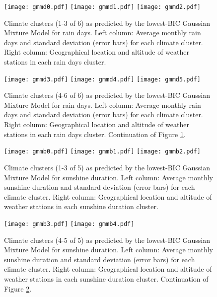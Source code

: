 \documentclass[12pt]{iopart}
\begin{document}
\begin{figure}
\begin{center}
\texttt{[image: gmmd0.pdf]}
\texttt{[image: gmmd1.pdf]}
\texttt{[image: gmmd2.pdf]}
\caption{Climate clusters (1-3 of 6) as predicted by the lowest-BIC Gaussian Mixture Model for rain days. Left column: Average monthly rain days and standard deviation (error bars) for each climate cluster. Right column: Geographical location and altitude of weather stations in each rain days cluster.}\label{clustd}
\end{center}
\end{figure}

\begin{figure}
\begin{center}
\texttt{[image: gmmd3.pdf]}
\texttt{[image: gmmd4.pdf]}
\texttt{[image: gmmd5.pdf]}
\caption{Climate clusters (4-6 of 6) as predicted by the lowest-BIC Gaussian Mixture Model for rain days. Left column: Average monthly rain days and standard deviation (error bars) for each climate cluster. Right column: Geographical location and altitude of weather stations in each rain days cluster. Continuation of Figure \ref{clustd}.}
\end{center}
\end{figure}

\begin{figure}
\begin{center}
\texttt{[image: gmmb0.pdf]}
\texttt{[image: gmmb1.pdf]}
\texttt{[image: gmmb2.pdf]}
\caption{Climate clusters (1-3 of 5) as predicted by the lowest-BIC Gaussian Mixture Model for sunshine duration. Left column: Average monthly sunshine duration and standard deviation (error bars) for each climate cluster. Right column: Geographical location and altitude of weather stations in each sunshine duration cluster.}\label{clustb1}
\end{center}
\end{figure}

\begin{figure}
\begin{center}
\texttt{[image: gmmb3.pdf]}
\texttt{[image: gmmb4.pdf]}
\caption{Climate clusters (4-5 of 5) as predicted by the lowest-BIC Gaussian Mixture Model for sunshine duration. Left column: Average monthly sunshine duration and standard deviation (error bars) for each climate cluster. Right column: Geographical location and altitude of weather stations in each sunshine duration cluster. Continuation of Figure \ref{clustb1}.}\label{clustb}
\end{center}
\end{figure}
\end{document}
